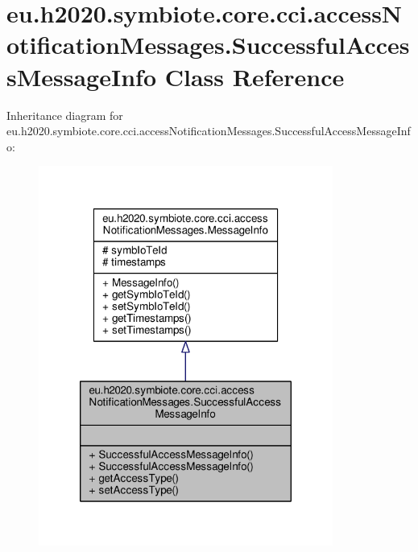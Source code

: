 \hypertarget{classeu_1_1h2020_1_1symbiote_1_1core_1_1cci_1_1accessNotificationMessages_1_1SuccessfulAccessMessageInfo}{}\section{eu.\+h2020.\+symbiote.\+core.\+cci.\+access\+Notification\+Messages.\+Successful\+Access\+Message\+Info Class Reference}
\label{classeu_1_1h2020_1_1symbiote_1_1core_1_1cci_1_1accessNotificationMessages_1_1SuccessfulAccessMessageInfo}


Inheritance diagram for eu.\+h2020.\+symbiote.\+core.\+cci.\+access\+Notification\+Messages.\+Successful\+Access\+Message\+Info\+:\nopagebreak
\begin{figure}[H]
\begin{center}
\leavevmode
\includegraphics[width=274pt]{classeu_1_1h2020_1_1symbiote_1_1core_1_1cci_1_1accessNotificationMessages_1_1SuccessfulAccessMessageInfo__inherit__graph}
\end{center}
\end{figure}


